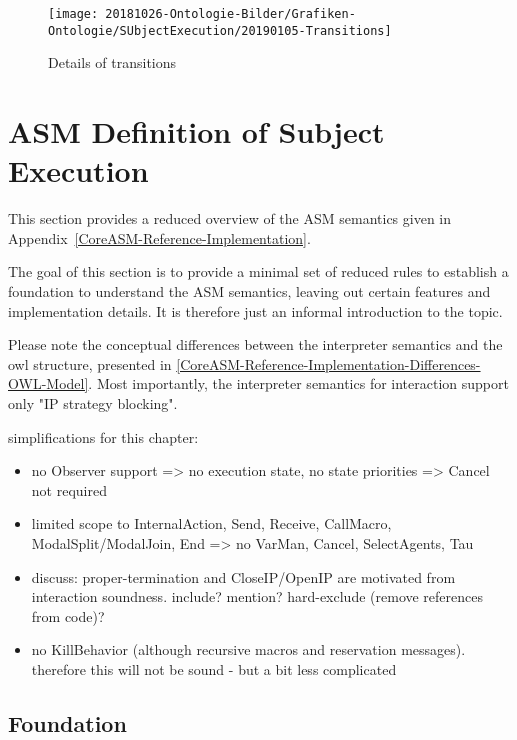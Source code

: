 \begin{figure}[htbp]
	\centering
	\texttt{[image: 20181026-Ontologie-Bilder/Grafiken-Ontologie/SUbjectExecution/20190105-Transitions]}
	\caption[Details of transitions]{Details of transitions}
	\label{fig:20190105-transitions}
\end{figure}


\section{ASM Definition of Subject Execution}



This section provides a reduced overview of the ASM semantics given in Appendix~\ref{CoreASM-Reference-Implementation}.

The goal of this section is to provide a minimal set of reduced rules to establish a foundation to understand the ASM semantics,
leaving out certain features and implementation details.
It is therefore just an informal introduction to the topic.

Please note the conceptual differences between the interpreter semantics and the owl structure, presented in \ref{CoreASM-Reference-Implementation-Differences-OWL-Model}.
Most importantly, the interpreter semantics for interaction support only "IP strategy blocking".

simplifications for this chapter:
\begin{itemize}
	\item no Observer support => no execution state, no state priorities => Cancel not required
	\item limited scope to InternalAction, Send, Receive, CallMacro, ModalSplit/ModalJoin, End => no VarMan, Cancel, SelectAgents, Tau
	\item discuss: proper-termination and CloseIP/OpenIP are motivated from interaction soundness. include? mention? hard-exclude (remove references from code)?
	\item no KillBehavior (although recursive macros and reservation messages). therefore this will not be sound - but a bit less complicated
\end{itemize}

\subsection{Foundation}

